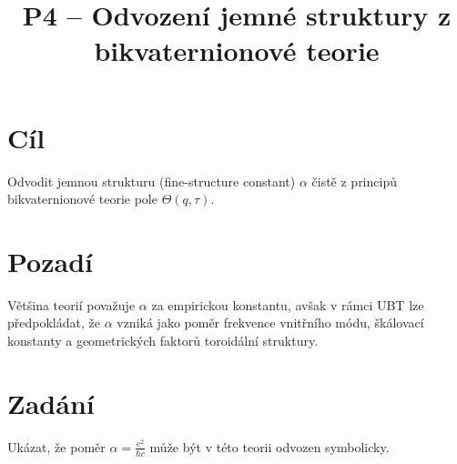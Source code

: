 \documentclass{article}
\title{P4 – Odvození jemné struktury z bikvaternionové teorie}
\author{}
\date{}
\begin{document}
\maketitle

\section*{Cíl}
Odvodit jemnou strukturu (fine-structure constant) $\alpha$ čistě z principů bikvaternionové teorie pole $\Theta(q, \tau)$.

\section*{Pozadí}
Většina teorií považuje $\alpha$ za empirickou konstantu, avšak v rámci UBT lze předpokládat, že $\alpha$ vzniká jako poměr frekvence vnitřního módu, škálovací konstanty a geometrických faktorů toroidální struktury.

\section*{Zadání}
Ukázat, že poměr $\alpha = \frac{e^2}{\hbar c}$ může být v této teorii odvozen symbolicky.
\end{document}
